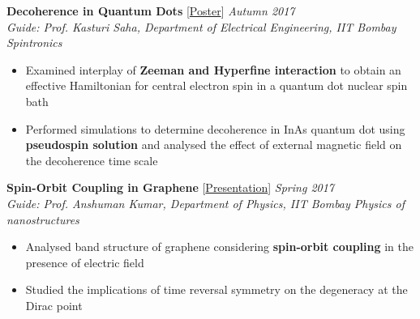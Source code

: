 \documentclass[10pt]{article}%
\newcommand{\xfilll}[2][1ex]{
\dimen0=#2\advance\dimen0 by #1
\leaders\hrule height \dimen0 depth -#1\hfill}
\begin{document}
{
\vspace{-3mm}
{\flushleft \bf \large{Decoherence in Quantum Dots}} [\href{https://www.google.com/url?q=https%3A%2F%2Fbighome.iitb.ac.in%2Findex.php%2Fs%2FsdU2MtnBRNsytt9&sa=D&sntz=1&usg=AFQjCNGgNmMIDkn5vaH5aouBLhHL53AlJA}{Poster}]  \hfill \textit{Autumn 2017} \\
{\em Guide: Prof. Kasturi Saha, Department of Electrical Engineering, IIT Bombay \hfill Spintronics}
\vspace{-1.5mm}
\begin{itemize}
\setlength\itemsep{0.01em}
   \item    Examined interplay of \textbf{Zeeman and Hyperfine interaction} to obtain an effective Hamiltonian for central electron spin in a quantum dot nuclear spin bath
    \item   Performed simulations to determine decoherence in InAs quantum dot using \textbf{pseudospin solution} and analysed the effect of external magnetic field on the decoherence time scale 
\end{itemize}



{\flushleft \bf \large{Spin-Orbit Coupling in Graphene}} [\href{https://www.google.com/url?q=https%3A%2F%2Fbighome.iitb.ac.in%2Findex.php%2Fs%2F5QcIL1HEGfFxNHu&sa=D&sntz=1&usg=AFQjCNFVORRMSdaonJwWcaGows0Odmuwxw}{Presentation}]  \hfill \textit{Spring 2017}\\
{\em Guide: Prof. Anshuman Kumar, Department of Physics, IIT Bombay \hfill Physics of nanostructures}
\vspace{-1.5mm}
\begin{itemize}
\setlength\itemsep{0.01em}
    \item Analysed band structure of graphene considering \textbf{spin-orbit coupling} in the presence of  electric field
    \item Studied the implications of time reversal symmetry on the degeneracy at the Dirac point
\end{itemize}

}
\end{document}
